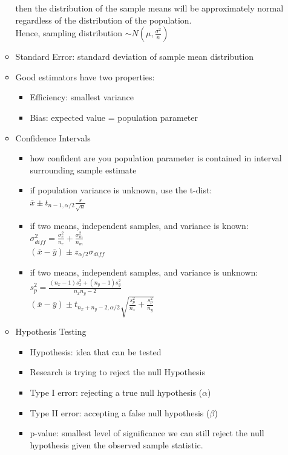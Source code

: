 \documentclass{article}
\begin{document}
\begin{multicols*}{3}
\begin{itemize}[noitemsep]
\begin{itemize}
            then the distribution of the sample means will be approximately normal regardless 
            of the distribution of the population. \\ 
            Hence, sampling distribution $\sim N(\mu, \frac{\sigma^2}{n})$
            \item Standard Error: standard deviation of sample mean distribution
            \item Good estimators have two properties:
            \begin{itemize}
                \item Efficiency: smallest variance
                \item Bias: expected value = population parameter
            \end{itemize}
            \item Confidence Intervals
            \begin{itemize}
                \item how confident are you population parameter is contained in interval
                surrounding sample estimate
                \item if population variance is unknown, use the t-dist: \\
                $\overline{x} \pm t_{n-1,\alpha/2}\frac{s}{\sqrt{n}}$
                \item if two means, independent samples, and variance is known: \\
                $\sigma_{diff}^2 = \frac{\sigma_e^2}{n_e} + \frac{\sigma_m^2}{n_m}$ \\
                $(\overline{x} - \overline{y}) \pm z_{\alpha/2}\sigma_{diff}$
                \item if two means, independent samples, and variance is unknown: \\
                $s_p^2 = \frac{(n_x-1)s_x^2 + (n_y - 1)s_y^2}{n_x n_y -2}$ \\
                $(\overline{x}-\overline{y}) \pm t_{n_x+n_y-2,\alpha/2}\sqrt{\frac{s_p^2}{n_x} + \frac{s_p^2}{n_y}}$
            \end{itemize}
            \item Hypothesis Testing 
            \begin{itemize}
                \item Hypothesis: idea that can be tested
                \item Research is trying to reject the null Hypothesis
                \item Type I error: rejecting a true null hypothesis ($\alpha$)
                \item Type II error: accepting a false null hypothesis ($\beta$)
                \item p-value: smallest level of significance we can still reject 
                the null hypothesis given the observed sample statistic.
            \end{itemize}
        \end{itemize}
    \end{itemize}



\end{multicols*}
\end{document}
